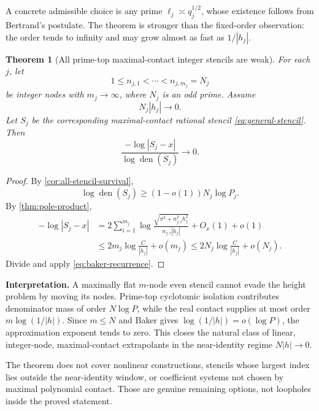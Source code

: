 \documentclass[11pt]{article}
\newtheorem{theorem}{Theorem}[section]
\theoremstyle{definition}
\newcommand{\den}{\operatorname{den}}
\begin{document}
A concrete admissible choice is any prime
$\ell_j\asymp q_j^{1/2}$, whose existence follows from Bertrand's postulate.
The theorem is stronger than the fixed-order observation: the order tends to
infinity and may grow almost as fast as $1/|h_j|$.

\begin{theorem}[All prime-top maximal-contact integer stencils are weak]
\label{thm:all-stencil-no-go}
For each $j$, let
\[
 1\le n_{j,1}<\cdots<n_{j,m_j}=N_j
\]
be integer nodes with $m_j\to\infty$, where $N_j$ is an odd prime.  Assume
\begin{equation}
 N_j|h_j|\to0.
 \label{eq:node-window}
\end{equation}
Let $S_j$ be the corresponding maximal-contact rational stencil
\eqref{eq:general-stencil}.  Then
\begin{equation}
 \boxed{
 \frac{-\log|S_j-x|}{\log\den(S_j)}\longrightarrow0.
 }
 \label{eq:all-stencil-no-go}
\end{equation}
\end{theorem}

\begin{proof}
By \cref{cor:all-stencil-survival},
\[
 \log\den(S_j)\ge(1-o(1))N_j\log P_j.
\]
By \cref{thm:pole-product},
\begin{align*}
 -\log|S_j-x|
 &=2\sum_{i=1}^{m_j}
 \log\frac{\sqrt{\pi^2+n_{j,i}^2h_j^2}}
 {n_{j,i}|h_j|}+O_x(1)+o(1)\\
 &\le2m_j\log\frac{C}{|h_j|}+o(m_j)
 \le2N_j\log\frac{C}{|h_j|}+o(N_j).
\end{align*}
Divide and apply \eqref{eq:baker-recurrence}.
\end{proof}

\begin{resultbox}
\textbf{Interpretation.}
A maximally flat $m$-node even stencil cannot evade the height problem by
moving its nodes.  Prime-top cyclotomic isolation contributes denominator
mass of order $N\log P$, while the real contact supplies at most order
$m\log(1/|h|)$.  Since $m\le N$ and Baker gives
$\log(1/|h|)=o(\log P)$, the approximation exponent tends to zero.
This closes the natural class of linear, integer-node, maximal-contact
extrapolants in the near-identity regime $N|h|\to0$.
\end{resultbox}

The theorem does not cover nonlinear constructions, stencils whose largest
index lies outside the near-identity window, or coefficient systems not
chosen by maximal polynomial contact.  Those are genuine remaining options,
not loopholes inside the proved statement.
\end{document}
